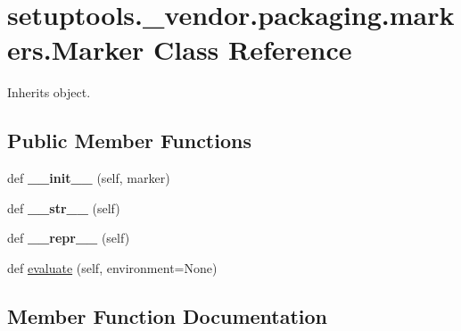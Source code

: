 \hypertarget{classsetuptools_1_1__vendor_1_1packaging_1_1markers_1_1_marker}{}\section{setuptools.\+\_\+vendor.\+packaging.\+markers.\+Marker Class Reference}
\label{classsetuptools_1_1__vendor_1_1packaging_1_1markers_1_1_marker}


Inherits object.

\subsection*{Public Member Functions}
\begin{DoxyCompactItemize}
\item 
\mbox{\label{classsetuptools_1_1__vendor_1_1packaging_1_1markers_1_1_marker_a4f2c2b7b2ace011874a56ab0f5c0e24f}} 
def {\bfseries \+\_\+\+\_\+init\+\_\+\+\_\+} (self, marker)
\item 
\mbox{\label{classsetuptools_1_1__vendor_1_1packaging_1_1markers_1_1_marker_abed4ab5be8dabced95a93e8392f68fe7}} 
def {\bfseries \+\_\+\+\_\+str\+\_\+\+\_\+} (self)
\item 
\mbox{\label{classsetuptools_1_1__vendor_1_1packaging_1_1markers_1_1_marker_a4f8d3d5d8bc458e2d00f07c68a269793}} 
def {\bfseries \+\_\+\+\_\+repr\+\_\+\+\_\+} (self)
\item 
def \hyperlink{classsetuptools_1_1__vendor_1_1packaging_1_1markers_1_1_marker_a8d1f4d461e68c50f083b6753e0329491}{evaluate} (self, environment=None)
\end{DoxyCompactItemize}


\subsection{Member Function Documentation}
\mbox{\label{classsetuptools_1_1__vendor_1_1packaging_1_1markers_1_1_marker_a8d1f4d461e68c50f083b6753e0329491}} 
